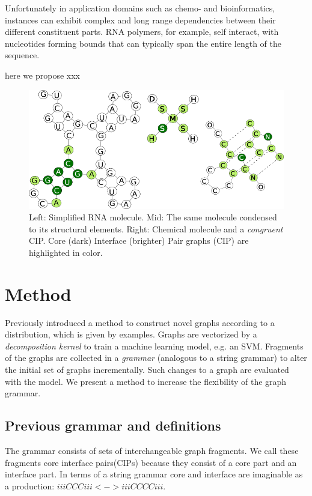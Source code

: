 \documentclass{article}
\begin{document}
Unfortunately in application domains such as chemo- and bioinformatics,
instances can exhibit complex and long range dependencies between their
different constituent parts. RNA polymers, for example, self interact, with
nucleotides forming bounds that can typically span the entire length of the
sequence.

here we propose xxx

% 
\begin{figure}[ht]
      \centering
        \includegraphics[width=1.0\linewidth]{images/allcipsinone.png}
      \caption{Left: Simplified RNA molecule. Mid: The same molecule 
      condensed to its structural elements. Right: Chemical molecule and a
      \emph{congruent} CIP. Core (dark) Interface (brighter) Pair graphs (CIP)
      are
      highlighted in color.}
      \label{allcips}
\end{figure}

\section{Method}
Previously \cite{costa16} introduced a method
to construct novel graphs according to a distribution, which is given by
examples. Graphs are vectorized by a \emph{decomposition kernel}
to train a machine learning model, e.g. an SVM.
Fragments of the graphs are collected in 
a \emph{grammar} (analogous to a string grammar) to alter the initial
set of graphs incrementally. Such changes to a graph are evaluated with the
model. 
We present a method to increase the flexibility of the graph grammar.

\subsection{Previous grammar and definitions}

The grammar consists of sets of interchangeable graph fragments.
We call these fragments core interface pairs(CIPs) because 
they consist of a core part and an interface part.
In terms of a string grammar core and interface are imaginable 
as a production: $iiiCCCiii <-> iiiCCCCiii$. 
\end{document}
